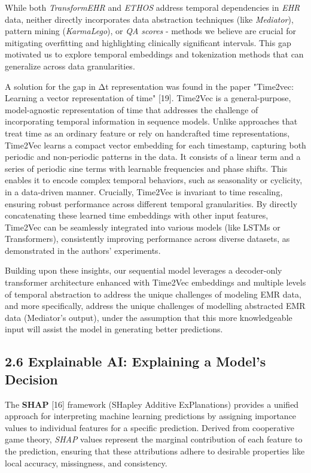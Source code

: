\documentclass[
]{article}
\begin{document}
While both \emph{TransformEHR} and \emph{ETHOS} address temporal
dependencies in \emph{EHR} data, neither directly incorporates data
abstraction techniques (like \emph{Mediator}), pattern mining
(\emph{KarmaLego}), or \emph{QA scores} - methods we believe are crucial
for mitigating overfitting and highlighting clinically significant
intervals. This gap motivated us to explore temporal embeddings and
tokenization methods that can generalize across data granularities.

A solution for the gap in Δt representation was found in the paper
"Time2vec: Learning a vector representation of time" {[}19{]}. Time2Vec
is a general-purpose, model-agnostic representation of time that
addresses the challenge of incorporating temporal information in
sequence models. Unlike approaches that treat time as an ordinary
feature or rely on handcrafted time representations, Time2Vec learns a
compact vector embedding for each timestamp, capturing both periodic and
non-periodic patterns in the data. It consists of a linear term and a
series of periodic sine terms with learnable frequencies and phase
shifts. This enables it to encode complex temporal behaviors, such as
seasonality or cyclicity, in a data-driven manner. Crucially, Time2Vec
is invariant to time rescaling, ensuring robust performance across
different temporal granularities. By directly concatenating these
learned time embeddings with other input features, Time2Vec can be
seamlessly integrated into various models (like LSTMs or Transformers),
consistently improving performance across diverse datasets, as
demonstrated in the authors' experiments.

Building upon these insights, our sequential model leverages a
decoder-only transformer architecture enhanced with Time2Vec embeddings
and multiple levels of temporal abstraction to address the unique
challenges of modeling EMR data, and more specifically, address the
unique challenges of modelling abstracted EMR data (Mediator's output),
under the assumption that this more knowledgeable input will assist the
model in generating better predictions.

\subsection{2.6 Explainable AI: Explaining a Model's
Decision}\label{explainable-ai-explaining-a-models-decision}

The \textbf{SHAP} {[}16{]} framework (SHapley Additive ExPlanations)
provides a unified approach for interpreting machine learning
predictions by assigning importance values to individual features for a
specific prediction. Derived from cooperative game theory, \emph{SHAP}
values represent the marginal contribution of each feature to the
prediction, ensuring that these attributions adhere to desirable
properties like local accuracy, missingness, and consistency.
\end{document}
